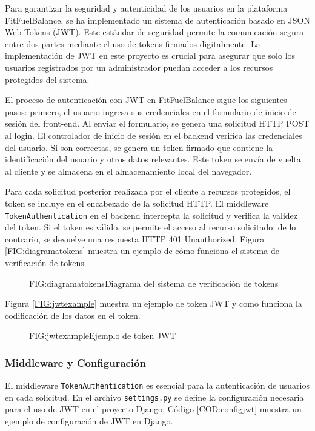 Para garantizar la seguridad y autenticidad de los usuarios en la plataforma FitFuelBalance, se ha implementado un sistema de autenticación basado en JSON Web Tokens (JWT). Este estándar de seguridad permite la comunicación segura entre dos partes mediante el uso de tokens firmados digitalmente. La implementación de JWT en este proyecto es crucial para asegurar que solo los usuarios registrados por un administrador puedan acceder a los recursos protegidos del sistema.

El proceso de autenticación con JWT en FitFuelBalance sigue los siguientes pasos: primero, el usuario ingresa sus credenciales en el formulario de inicio de sesión del front-end. Al enviar el formulario, se genera una solicitud HTTP POST al login. El controlador de inicio de sesión en el backend verifica las credenciales del usuario. Si son correctas, se genera un token firmado que contiene la identificación del usuario y otros datos relevantes. Este token se envía de vuelta al cliente y se almacena en el almacenamiento local del navegador.

Para cada solicitud posterior realizada por el cliente a recursos protegidos, el token se incluye en el encabezado de la solicitud HTTP. El middleware \texttt{TokenAuthentication} en el backend intercepta la solicitud y verifica la validez del token. Si el token es válido, se permite el acceso al recurso solicitado; de lo contrario, se devuelve una respuesta HTTP 401 Unauthorized. Figura \ref{FIG:diagramatokens} muestra un ejemplo de cómo funciona el sistema de verificación de tokens.

\begin{figure}[Diagrama Tokens]{FIG:diagramatokens}{Diagrama del sistema de verificación de tokens}
\end{figure}

Figura \ref{FIG:jwtexample} muestra un ejemplo de token JWT y como funciona la codificación de los datos en el token.

\begin{figure}[Ejemplo Token]{FIG:jwtexample}{Ejemplo de token JWT}
\end{figure}

\subsubsection{Middleware y Configuración}

El middleware \texttt{TokenAuthentication} es esencial para la autenticación de usuarios en cada solicitud. En el archivo \texttt{settings.py} se define la configuración necesaria para el uso de JWT en el proyecto Django, Código \ref{COD:configjwt} muestra un ejemplo de configuración de JWT en Django.

